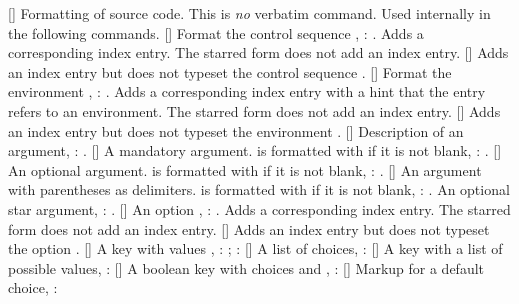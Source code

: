 \documentclass[load-preamble]{cnltx-doc}
\begin{document}
\begin{commands}
  []
    Formatting of source code.  This is \emph{no} verbatim command.  Used
    internally in the following commands.
  [\sarg{}]
    Format the control sequence , :
    .  Adds a corresponding index entry.  The starred form does not
    add an index entry.
  []
    Adds an index entry but does not typeset the control sequence
    .
  [\sarg{}]
    Format the environment , :
    .  Adds a corresponding index entry with a hint that the entry
    refers to an environment.  The starred form does not add an index entry.
  []
    Adds an index entry but does not typeset the environment .
  []
    Description of an argument, : .
  []
    A mandatory argument.  is formatted with  if it is not
    blank, : .
  []
    An optional argument.  is formatted with  if it is not
    blank, : .
  []
    An argument with parentheses as delimiters.  is formatted with
     if it is not blank, : .
    An optional star argument, : \sarg.
  [\sarg{}]
    An option , : .  Adds a
    corresponding index entry.  The starred form does not add an index entry.
  []
    Adds an index entry but does not typeset the option .
  [\sarg{}]
    A key  with values ,
    : ;
    \sarg{}: 
  []
    A list of choices, :
  []
    A key  with a list of possible values,
    :
  []
    A boolean key  with choices  and ,
    : 
  []
    Markup for a default choice,
    :
\end{commands}
\end{document}
